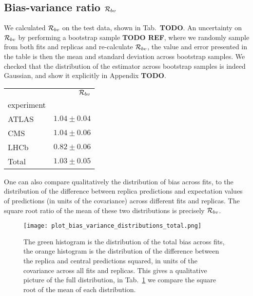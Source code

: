 \subsection{Bias-variance ratio $\mathcal{R}_{bv}$}

We calculated $\mathcal{R}_{bv}$ on the test data, shown in Tab.~{\bf TODO}. An
uncertainty on $\mathcal{R}_{bv}$ by performing a bootstrap sample {\bf TODO REF},
where we randomly sample from both fits and replicas and re-calculate
$\mathcal{R}_{bv}$, the value and error presented in the table is then the mean
and standard deviation across bootstrap samples. We checked that the distribution
of the estimator across bootstrap samples is indeed Gaussian, and show it explicitly
in Appendix {\bf TODO}.

\begin{table}
    \label{tab:biasvarratio}
    \begin{center}
        \begin{tabular}{lr}
            \toprule
            {} &  $\mathcal{R}_{bv}$ \\
            experiment &                      \\
            \midrule
            ATLAS       &                 $1.04 \pm 0.04$  \\
            CMS         &                 $1.04 \pm 0.06$ \\
            LHCb       &                 $0.82 \pm 0.06$ \\
            Total       &                 $ 1.03 \pm 0.05$ \\
            \bottomrule
        \end{tabular}
    \end{center}
\end{table}

One can also compare qualitatively the distribution of bias across fits, to the
distribution of the difference between replica predictions and expectation
values of predictions (in units of the covariance) across different fits
and replicas. The square root ratio of the mean of these two distributions
is precisely $\mathcal{R}_{bv}$.

\begin{figure}
    \centering
    \texttt{[image: plot\_bias\_variance\_distributions\_total.png]}
    \caption{The green histogram is the distribution of the total bias across fits,
    the orange histogram is the distribution of the difference between the
    replica and central predictions squared, in units of the covariance
    across all fits and replicas. This gives a qualitative picture of the full
    distribution, in Tab.~\ref{tab:biasvarratio} we compare the square root of the
    mean of each distribution.}
\end{figure}

